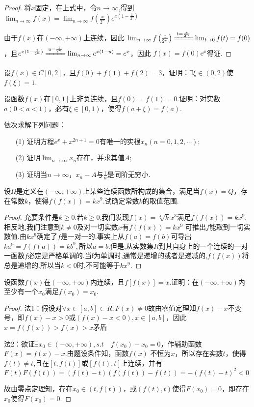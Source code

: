 \begin{xiti}
\begin{proof}
	将$x$固定，在上式中，令$n \rightarrow \infty$,得到
	$\lim_{n \rightarrow \infty}f(x)=\lim_{n \rightarrow \infty}f(\frac{x}{2^{n}})e^{x(1-\frac{1}{2^n})}$
	
	由于$f(x)$在$(-\infty,+\infty)$上连续，因此
	$\lim _{n \rightarrow \infty} f\left(\frac{x}{2^{n}}\right)\xlongequal[\qquad]{t=\frac{x}{2^{n}}} \lim _{t \rightarrow 0} f(t)=f(0)$，且$e^{x(1-\frac{1}{2^n})}\xlongequal[\qquad]{u=\frac{1}{2^n}}\lim_{n \rightarrow \infty}e^{x(1-u)}=e^x$，因此 $f(x)=f(0)\mathrm{e}^{x}$得证.
\end{proof}
\item 设$f ( x ) \in C [ 0,2 ]$，且$f ( 0 ) + f ( 1 ) + f ( 2 ) = 3$，证明：$\exists \xi \in ( 0,2 )$使$f(\xi)=1$.
\item 设函数$f(x)$在$[0,1]$上非负连续，且$f(0)=f(1)=0$.证明：对实数$a(0<a<1)$，必有$\xi \in \left[ 0,1\right) $，使得$f(a+\xi )=f(a)$.
\item 依次求解下列问题：
\begin{enumerate}
	\item [(1)] 证明方程$e ^ { x } + x ^ { 2 n + 1 } = 0$有唯一的实根$x_{n}(n=0,1,2,\cdots)$;
	\item [(2)]证明$\lim_{ n \rightarrow \infty }x_{n}$存在，并求其值$A$;
	\item [(3)]证明当$n\rightarrow \infty$，$x_{n}-A$与$\frac{1}{n}$是同阶无穷小.
\end{enumerate}
\item 设$\Omega$是定义在$(-\infty,+\infty)$上某些连续函数所构成的集合，满足当$f(x)=Q$，存在常数$k$，使得$f ( f ( x ) ) = k x ^ { 9 }$.试确定常数$k$的取值范围.
\begin{proof}
	充要条件是$k \ge 0$.若$k \ge 0 $,我们发现$ f(x) =\sqrt[4]{k}x^3 $满足$f(f(x)) = kx^9 $. 相反地,我们注意到$ k\not =0 $及对一切实数$ x $有$ f(f(x)) = kx^9 $ 可推出$ f $能取到一切实数值.由$ kx^9 $确定了$ f $是一对一的.事实上从$ f(a) = f(b) $可导出 $ ka^9= f(f(a)) = kb^9, $所以$ a = b. $但是,从实数集$ R $到其自身上的一个连续的一对一函数$ f $必定是严格单调的.当f为单调时,通常是递增的或者是递减的,$ f(f(x)) $将总是递增的.所以当$ k < 0 $时,不可能等于$ kx^9 $.
\end{proof}
\item 设函数$f(x)$在$(-\infty,+\infty)$内连续，且$f[f(x)]=x$.证明：在$(-\infty,+\infty)$内至少有一个$x_{0}$满足$f(x_{0})=x_{0}$.

\begin{proof}
	法1：假设对$\forall x\in [a,b]\subset R,F(x)\not=0$故由零值定理知$f(x)-x$不变号，即$f(x)-x>0\text{或}(f(x)-x<0),x\in [a,b]$，因此$x=f(f(x))>f(x)>x$矛盾
	
	法2：欲证$\exists x_{0} \in (-\infty ,+\infty),s.t\quad f(x_{0})-x_{0}=0$，作辅助函数$F(x)=f(x)-x$.由题设条件知，函数$f(x)$ 不恒为$x$，所以存在实数$t$，使得$f(t)\not =t$,且在$[t,f(t)]\text{或}[f(t),t]$上连续，并有
	$F(t)F(f(t))=(f(t)-t)(f(f(t))-f(t))=-(f(t)-t)^2<0$
	
	故由零点定理知，存在$x_{0}\in (t,f(t))$，或$(f(t),t)$使得$F(x_{0})=0$，即存在$x_{0}$使得$F(x_{0})=0$.

\end{proof}

\end{xiti}

